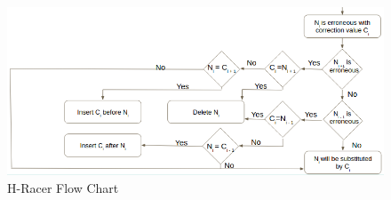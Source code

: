 \documentclass[12pt,openany]{llncs}
\begin{document}
\begin{figure}
	\centering
	\includegraphics[width=1.3\linewidth]{./figs/Second-Proposal-1}
	\caption{\label{fig:fig-Second-Proposal-1}H-Racer Flow Chart}
\end{figure}
\end{document}
